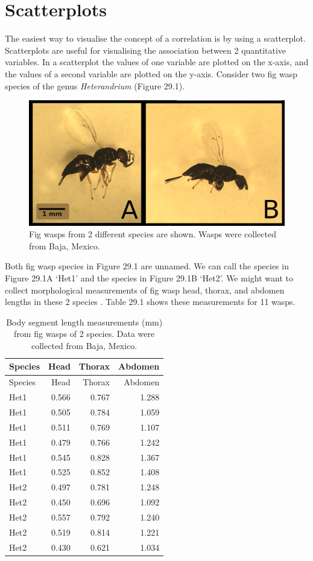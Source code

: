 \documentclass[
]{scrbook}
\begin{document}
\hypertarget{scatterplots}{%
\section{Scatterplots}\label{scatterplots}}

The easiest way to visualise the concept of a correlation is by using a scatterplot.
Scatterplots are useful for visualising the association between 2 quantitative variables.
In a scatterplot the values of one variable are plotted on the x-axis, and the values of a second variable are plotted on the y-axis.
Consider two fig wasp species of the genus \emph{Heterandrium} (Figure 29.1).

\begin{figure}
\includegraphics[width=1\linewidth]{img/heterandrium} \caption{Fig wasps from 2 different species are shown. Wasps were collected from Baja, Mexico.}\label{fig:unnamed-chunk-143}
\end{figure}

Both fig wasp species in Figure 29.1 are unnamed.
We can call the species in Figure 29.1A `Het1' and the species in Figure 29.1B `Het2'.
We might want to collect morphological measurements of fig wasp head, thorax, and abdomen lengths in these 2 species \citep{Duthie2015b}.
Table 29.1 shows these measurements for 11 wasps.

\begin{longtable}[]{@{}lrrr@{}}
\caption{\label{tab:unnamed-chunk-144}Body segment length measurements (mm) from fig wasps of 2 species. Data were collected from Baja, Mexico.}\tabularnewline
\toprule
Species & Head & Thorax & Abdomen \\
\midrule
\endfirsthead
\toprule
Species & Head & Thorax & Abdomen \\
\midrule
\endhead
Het1 & 0.566 & 0.767 & 1.288 \\
Het1 & 0.505 & 0.784 & 1.059 \\
Het1 & 0.511 & 0.769 & 1.107 \\
Het1 & 0.479 & 0.766 & 1.242 \\
Het1 & 0.545 & 0.828 & 1.367 \\
Het1 & 0.525 & 0.852 & 1.408 \\
Het2 & 0.497 & 0.781 & 1.248 \\
Het2 & 0.450 & 0.696 & 1.092 \\
Het2 & 0.557 & 0.792 & 1.240 \\
Het2 & 0.519 & 0.814 & 1.221 \\
Het2 & 0.430 & 0.621 & 1.034 \\
\bottomrule
\end{longtable}
\end{document}
